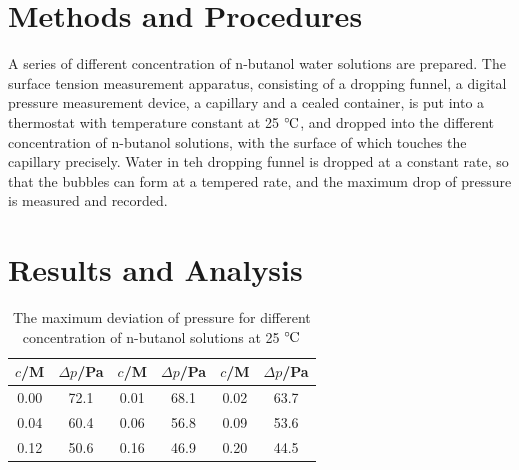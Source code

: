 \documentclass[%
 reprint,
 amsmath,amssymb,
 aps,
10.5pt,
]{revtex4-1}
\newcommand{\celsius}{\ensuremath{^\circ\hspace{-0.09em}\mathrm{C}}}
\begin{document}
\section{Methods and Procedures}
A series of different concentration of n-butanol water solutions are prepared. The surface tension measurement apparatus, consisting of a dropping funnel, a digital pressure measurement device, a capillary and a cealed container, is put into a thermostat with temperature constant at 25 \celsius, and dropped into the different concentration of n-butanol solutions, with the surface of which touches the capillary precisely. Water in teh dropping funnel is dropped at a constant rate, so that the bubbles can form at a tempered rate, and the maximum drop of pressure is measured and recorded.

\section{Results and Analysis}
\begin{table}
\centering
\caption{The maximum deviation of pressure for different concentration of n-butanol solutions at 25 \celsius}
\begin{tabular}{cc|cc|cc}\hline
$c$/M & $\Delta p$/Pa & $c$/M & $\Delta p$/Pa & $c$/M & $\Delta p$/Pa \\ \hline
 0.00 & 72.1 & 0.01 & 68.1 & 0.02 & 63.7 \\
 0.04 & 60.4 & 0.06 & 56.8 & 0.09 & 53.6 \\
 0.12 & 50.6 & 0.16 & 46.9 & 0.20 & 44.5 \\\hline
\end{tabular}
\label{data}
\end{table}
\end{document}

